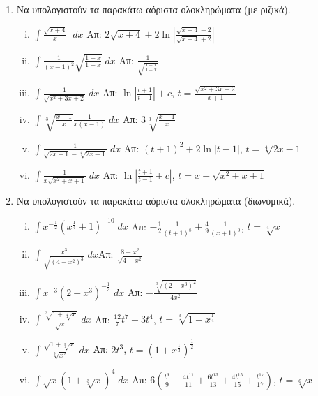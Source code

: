 \documentclass[a4paper,table]{report}
\begin{document}
\begin{center}
  \minibox{\large\bfseries \textcolor{Col1}{Αόριστα Ολοκληρώματα}}
\end{center}

\vspace{\baselineskip}

\begin{enumerate}
\item Να υπολογιστούν τα παρακάτω αόριστα ολοκληρώματα (με ριζικά).
  \begin{enumerate}[i)]
\item $\int\frac{\sqrt{x+4}}{x} \; \; dx$
  \hfill Απ: $2\sqrt{x+4}+2\ln\left|\frac{\sqrt{x+4}-2}{\sqrt{x+4}+2}\right|$
\item $\int\frac{1}{(x-1)^2}\sqrt{\frac{1-x}{1+x}}\; dx$
  \hfill Απ: $\frac{1}{\sqrt{\frac{1-x}{1+x}}}$
\item $\int\frac{1}{\sqrt{x^2+3x+2}}\; dx$
  \hfill Απ: $\ln\left|\frac{t+1}{t-1}\right|+c$, \; $t=\frac{\sqrt{x^2+3x+2}}{x+1}$
\item $\int\sqrt[3]{\frac{x-1}{x}}\frac{1}{x(x-1)}\; dx$
  \hfill Απ: $3\sqrt[3]{\frac{x-1}{x}} $
\item $\int\frac{1}{\sqrt{2x-1}-\sqrt[4]{2x-1}}\; dx$
  \hfill Απ: $(t+1)^2 +2\ln|t-1|$, \; $t=\sqrt[4]{2x-1}$
\item $\int\frac{1}{x\sqrt{x^2+x+1}}\; dx$
  \hfill Απ: $\ln\left|\frac{t+1}{t-1}+c\right|$, \; $t=x-\sqrt{x^2+x+1}$
\end{enumerate}

\item Να υπολογιστούν τα παρακάτω αόριστα ολοκληρώματα (διωνυμικά).
  \begin{enumerate}[i)]
\item $\int x^{-\frac{1}{2}}(x^{\frac{1}{4}}+1)^{-10}\; dx$
  \hfill Απ: $-\frac{1}{2}\frac{1}{(t+1)^8}+\frac{4}{9}\frac{1}{(x+1)^9}$, \; 
  $t=\sqrt[4]{x}$
\item $\int\frac{x^{3}}{\sqrt{(4-x^2)^3}}\; dx$\hfill Απ: $\frac{8-x^2}{\sqrt{4-x^2}}$
\item $\int x^{-3}(2-x^3)^{-\frac{1}{3}} \; dx$
  \hfill Απ: $-\frac{\sqrt[3]{(2-x^3)^2}}{4x^2} $
\item $\int\frac{\sqrt[3]{1+\sqrt[4]{x}}}{\sqrt{x}}\; dx$
  \hfill Απ: $\frac{12}{7}t^7-3t^4$, \; $t=\sqrt[3]{1+x^{\frac{1}{4}}}$
\item $\int \frac{\sqrt{1+\sqrt[3]{x}}}{\sqrt[3]{x^2}}\; dx$
  \hfill Απ: $2t^3$, \; $t=(1+x^{\frac{1}{3}})^{\frac{1}{2}}$
\item $\int\sqrt{x}(1+\sqrt[3]{x})^4\; dx$
  \hfill Απ: $6\left(\frac{t^9}{9}+\frac{4t^{11}}{11}+\frac{6t^{13}}{13}+
    \frac{4t^{15}}{15}+ \frac{t^{17}}{17}\right)$, \; $t=\sqrt[6]{x}$
\end{enumerate}


\end{enumerate}
\end{document}
